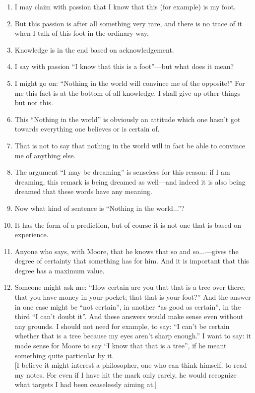 \documentclass{book}
\begin{document}
\begin{enumerate}
\item
I may claim with passion that I know that this (for example) is my foot.

\item
But this passion is after all something very rare, and there is no trace of it
when I talk of this foot in the ordinary way.

\item
Knowledge is in the end based on acknowledgement.

\item
I say with passion ``I know that this is a foot''---but what does it mean?

\item
I might go on: ``Nothing in the world will convince me of the opposite!'' For
me this fact is at the bottom of all knowledge. I shall give up other things
but not this.

\item
This ``Nothing in the world'' is obviously an attitude which one hasn't got
towards everything one believes or is certain of.

\item
That is not to say that nothing in the world will in fact be able to convince
me of anything else.

\item
The argument ``I may be dreaming'' is senseless for this reason: if I am
dreaming, this remark is being dreamed as well---and indeed it is also being
dreamed that these words have any meaning.

\item
Now what kind of sentence is ``Nothing in the world...''?

\item
It has the form of a prediction, but of course it is not one that is based on
experience.

\item
Anyone who says, with Moore, that he knows that so and so...---gives the degree
of certainty that something has for him. And it is important that this degree
has a maximum value.

\item
Someone might ask me: ``How certain are you that that is a tree over there;
that you have money in your pocket; that that is your foot?'' And the answer in
one case might be ``not certain'', in another ``as good as certain'', in the
third ``I can't doubt it''. And these answers would make sense even without any
grounds. I should not need for example, to say: ``I can't be certain whether
that is a tree because my eyes aren't sharp enough.'' I want to say: it made
sense for Moore to say ``I know that that is a tree'', if he meant something
quite particular by it.
\\
{[}I believe it might interest a philosopher, one who can think himself, to
read my notes. For even if I have hit the mark only rarely, he would recognize
what targets I had been ceaselessly aiming at.{]}


\end{enumerate}
\end{document}
